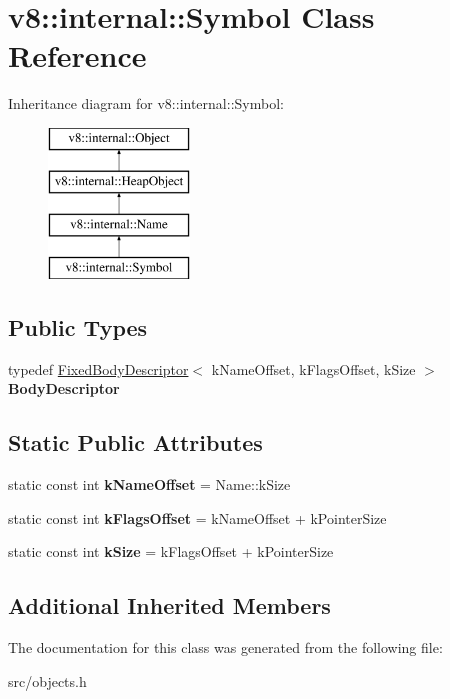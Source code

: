 \hypertarget{classv8_1_1internal_1_1_symbol}{}\section{v8\+:\+:internal\+:\+:Symbol Class Reference}
\label{classv8_1_1internal_1_1_symbol}
Inheritance diagram for v8\+:\+:internal\+:\+:Symbol\+:\begin{figure}[H]
\begin{center}
\leavevmode
\includegraphics[height=4.000000cm]{classv8_1_1internal_1_1_symbol}
\end{center}
\end{figure}
\subsection*{Public Types}
\begin{DoxyCompactItemize}
\item 
\hypertarget{classv8_1_1internal_1_1_symbol_a626f7958735462e79153ef0e34976555}{}typedef \hyperlink{classv8_1_1internal_1_1_fixed_body_descriptor}{Fixed\+Body\+Descriptor}$<$ k\+Name\+Offset, k\+Flags\+Offset, k\+Size $>$ {\bfseries Body\+Descriptor}\label{classv8_1_1internal_1_1_symbol_a626f7958735462e79153ef0e34976555}

\end{DoxyCompactItemize}
\subsection*{Static Public Attributes}
\begin{DoxyCompactItemize}
\item 
\hypertarget{classv8_1_1internal_1_1_symbol_a14fbd11fa0abcb101ac466bce1c9c283}{}static const int {\bfseries k\+Name\+Offset} = Name\+::k\+Size\label{classv8_1_1internal_1_1_symbol_a14fbd11fa0abcb101ac466bce1c9c283}

\item 
\hypertarget{classv8_1_1internal_1_1_symbol_a7518f1a85c7bc3754cf5625e7f750d2f}{}static const int {\bfseries k\+Flags\+Offset} = k\+Name\+Offset + k\+Pointer\+Size\label{classv8_1_1internal_1_1_symbol_a7518f1a85c7bc3754cf5625e7f750d2f}

\item 
\hypertarget{classv8_1_1internal_1_1_symbol_abb1c7a199d15453abd999c4542054e83}{}static const int {\bfseries k\+Size} = k\+Flags\+Offset + k\+Pointer\+Size\label{classv8_1_1internal_1_1_symbol_abb1c7a199d15453abd999c4542054e83}

\end{DoxyCompactItemize}
\subsection*{Additional Inherited Members}


The documentation for this class was generated from the following file\+:\begin{DoxyCompactItemize}
\item 
src/objects.\+h\end{DoxyCompactItemize}
